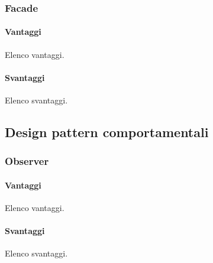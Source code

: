\documentclass[../SpecificaTecnica.tex]{subfiles}
\begin{document}
		\subsubsection{Facade}
		
			\paragraph{Vantaggi}
				Elenco vantaggi.
			\paragraph{Svantaggi}
				Elenco svantaggi.
	\subsection{Design pattern comportamentali}
		\subsubsection{Observer}
		
			\paragraph{Vantaggi}
				Elenco vantaggi.
			\paragraph{Svantaggi}
				Elenco svantaggi.
\end{document}
